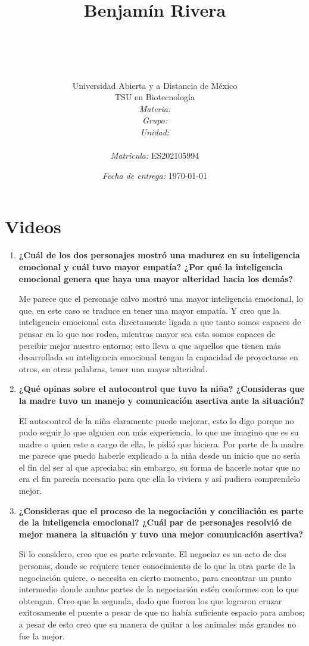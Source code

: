 \documentclass[12pt]{article}
\title{
	\ \\ Benjam\'in Rivera \\
	\bf{\titulo}\\\ \\}
\author{
	{\Huge Universidad Abierta y a Distancia de México}\\
	TSU en Biotecnolog\'ia \\
	\textit{Materia:} \materia \\
	\textit{Grupo:} \grupo \\
	\textit{Unidad:} \unidad \\
	\\
	\textit{Matricula:} ES202105994 }
\date{\textit{Fecha de entrega:} \today}
\begin{document}
\maketitle\newpage

\section{Videos}

\begin{enumerate}
	\item \textbf{ ¿Cuál de los dos personajes mostró una madurez en su inteligencia emocional y cuál tuvo mayor empatía? ¿Por qué la inteligencia emocional genera que haya una mayor alteridad hacia los demás? }
	
	Me parece que el personaje calvo mostró una mayor inteligencia emocional, lo que, en este caso se traduce en tener una mayor empatía. Y creo que la inteligencia emocional esta directamente ligada a que tanto somos capaces de pensar en lo que nos rodea, mientras mayor sea esta somos capaces de percibir mejor nuestro entorno; esto lleva a que aquellos que tienen más desarrollada su inteligencia emocional tengan la capacidad de proyectarse en otros, en otras palabras, tener una mayor alteridad.
	
	\item \textbf{ ¿Qué opinas sobre el autocontrol que tuvo la niña? ¿Consideras que la madre tuvo un manejo y comunicación asertiva ante la situación? }
	
	El autocontrol de la niña claramente puede mejorar, esto lo digo porque no pudo seguir lo que alguien con más experiencia, lo que me imagino que es su madre o quien este a cargo de ella, le pidió que hiciera. Por parte de la madre me parece que puedo haberle explicado a la niña desde un inicio que no sería el fin del ser al que apreciaba; sin embargo, su forma de hacerle notar que no era el fin parecía necesario para que ella lo viviera y así pudiera comprendelo mejor.
	
	\item \textbf{ ¿Consideras que el proceso de la negociación y conciliación es parte de la inteligencia emocional? ¿Cuál par de personajes resolvió de mejor manera la situación y tuvo una mejor comunicación asertiva? }
	
	Si lo considero, creo que es parte relevante. El negociar es un acto de dos personas, donde se requiere tener conocimiento de lo que la otra parte de la negociación quiere, o necesita en cierto momento, para encontrar un punto intermedio donde ambas partes de la negociación estén conformes con lo que obtengan. Creo que la segunda, dado que fueron los que lograron cruzar exitosamente el puente a pesar de que no había suficiente espacio para ambos; a pesar de esto creo que su manera de quitar a los animales más grandes no fue la mejor.
	

\end{enumerate}
\end{document}
